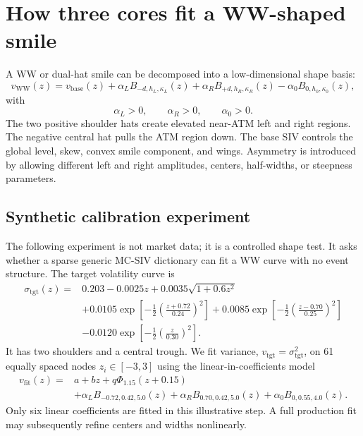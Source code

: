 \documentclass[11pt]{article}
\begin{document}
\section{How three cores fit a WW-shaped smile}
\label{sec:ww-example}

A WW or dual-hat smile can be decomposed into a low-dimensional shape basis:
\begin{equation}
  \boxed{
  v_{\mathrm{WW}}(z)
  =v_{\mathrm{base}}(z)
  +\alpha_L B_{-d,h_L,\kappa_L}(z)
  +\alpha_R B_{+d,h_R,\kappa_R}(z)
  -\alpha_0 B_{0,h_0,\kappa_0}(z),
  }
  \label{eq:ww-three-core}
\end{equation}
with
\begin{equation}
  \alpha_L>0,
  \qquad
  \alpha_R>0,
  \qquad
  \alpha_0>0.
\end{equation}
The two positive shoulder hats create elevated near-ATM left and right regions.  The negative central hat pulls the ATM region down.  The base SIV controls the global level, skew, convex smile component, and wings.  Asymmetry is introduced by allowing different left and right amplitudes, centers, half-widths, or steepness parameters.

\subsection{Synthetic calibration experiment}

The following experiment is not market data; it is a controlled shape test.  It asks whether a sparse generic MC-SIV dictionary can fit a WW curve with no event structure.  The target volatility curve is
\begin{align}
  \sigma_{\mathrm{tgt}}(z)
  ={}&0.203-0.0025z+0.0035\sqrt{1+0.6z^2}
  \nonumber\\
  &+0.0105\exp\!\left[-\frac12\left(\frac{z+0.72}{0.24}\right)^2\right]
  +0.0085\exp\!\left[-\frac12\left(\frac{z-0.70}{0.25}\right)^2\right]
  \nonumber\\
  &-0.0120\exp\!\left[-\frac12\left(\frac{z}{0.30}\right)^2\right].
  \label{eq:synthetic-target}
\end{align}
It has two shoulders and a central trough.  We fit variance, $v_{\mathrm{tgt}}=\sigma_{\mathrm{tgt}}^2$, on 61 equally spaced nodes $z_i\in[-3,3]$ using the linear-in-coefficients model
\begin{align}
  v_{\mathrm{fit}}(z)
  ={}&a+bz+q\Phi_{1.15}(z+0.15)
  \nonumber\\
  &+\alpha_L B_{-0.72,0.42,5.0}(z)
   +\alpha_R B_{0.70,0.42,5.0}(z)
   +\alpha_0 B_{0,0.55,4.0}(z).
  \label{eq:ww-fit-model}
\end{align}
Only six linear coefficients are fitted in this illustrative step.  A full production fit may subsequently refine centers and widths nonlinearly.
\end{document}
